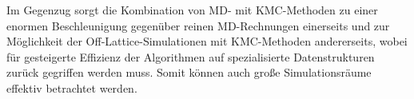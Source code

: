 Im Gegenzug sorgt die Kombination von MD- mit KMC-Methoden zu einer enormen Beschleunigung gegenüber reinen MD-Rechnungen einerseits und zur Möglichkeit der Off-Lattice-Simulationen mit KMC-Methoden andererseits, wobei für gesteigerte Effizienz der Algorithmen auf spezialisierte Datenstrukturen zurück gegriffen werden muss.
Somit können auch große Simulationsräume effektiv betrachtet werden.
